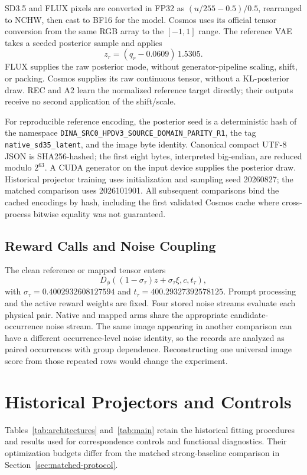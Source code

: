\documentclass[10pt,twocolumn,letterpaper]{article}
\begin{document}
SD3.5 and FLUX pixels are converted in FP32 as $(u/255-0.5)/0.5$, rearranged to NCHW, then cast to BF16 for the model. Cosmos uses its official tensor conversion from the same RGB array to the $[-1,1]$ range. The reference VAE takes a seeded posterior sample and applies
\begin{equation}
 z_r=(q_r-0.0609)\,1.5305.
\end{equation}
FLUX supplies the raw posterior mode, without generator-pipeline scaling, shift, or packing. Cosmos supplies its raw continuous tensor, without a KL-posterior draw. REC and A2 learn the normalized reference target directly; their outputs receive no second application of the shift/scale.

For reproducible reference encoding, the posterior seed is a deterministic hash of the namespace \texttt{DINA\_SRC0\_HPDV3\_}\allowbreak\texttt{SOURCE\_DOMAIN\_PARITY\_R1}, the tag \texttt{native\_sd35\_latent}, and the image byte identity. Canonical compact UTF-8 JSON is SHA256-hashed; the first eight bytes, interpreted big-endian, are reduced modulo $2^{63}$. A CUDA generator on the input device supplies the posterior draw. Historical projector training uses initialization and sampling seed 20260827; the matched comparison uses 2026101901. All subsequent comparisons bind the cached encodings by hash, including the first validated Cosmos cache where cross-process bitwise equality was not guaranteed.

\subsection{Reward Calls and Noise Coupling}
The clean reference or mapped tensor enters
\begin{equation}
 D_\phi((1-\sigma_\tau)z+\sigma_\tau\xi,c,t_\tau),
\end{equation}
with $\sigma_\tau=0.4002932608127594$ and $t_\tau=400.29327392578125$. Prompt processing and the active reward weights are fixed. Four stored noise streams evaluate each physical pair. Native and mapped arms share the appropriate candidate-occurrence noise stream. The same image appearing in another comparison can have a different occurrence-level noise identity, so the records are analyzed as paired occurrences with group dependence. Reconstructing one universal image score from those repeated rows would change the experiment.


\section{Historical Projectors and Controls}
\label{sec:historical}
Tables~\ref{tab:architectures} and~\ref{tab:main} retain the historical fitting procedures and results used for correspondence controls and functional diagnostics. Their optimization budgets differ from the matched strong-baseline comparison in Section~\ref{sec:matched-protocol}.
\end{document}
